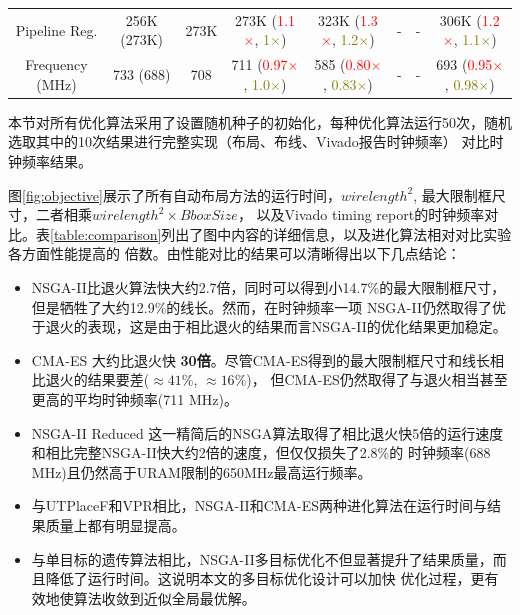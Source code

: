 \begin{table}[t]
\begin{adjustbox}{width=1.1\textwidth,center}
\begin{tabular}{c|c c| c c c c c}
  Pipeline Reg.		   & 256K  (273K) 		      & 273K	   		 &273K	   (\textcolor{red}{1.1$\times$}, \textcolor{olive}{1$\times$}) 	 	          & 323K	(\textcolor{red}{1.3$\times$}, \textcolor{olive}{1.2$\times$})   		  & -		                                                                      &   -                                                                            & 306K (\textcolor{red}{1.2$\times$}, \textcolor{olive}{1.1$\times$})   \\
  Frequency	(MHz)	 	 & 733  (688)   & 708 	 &711  (\textcolor{red}{0.97$\times$}, \textcolor{olive}{1.0$\times$})		        & 585 	(\textcolor{red}{0.80$\times$}, \textcolor{olive}{0.83$\times$})	& - 	      	                                                              & - 	                                                                           & 693 (\textcolor{red}{0.95$\times$}, \textcolor{olive}{0.98$\times$}) \\
	\bottomrule
	\end{tabular}
  \vspace{-0.2in}
\end{adjustbox}
\end{table}

本节对所有优化算法采用了设置随机种子的初始化，每种优化算法运行50次，随机选取其中的10次结果进行完整实现（布局、布线、Vivado报告时钟频率）
对比时钟频率结果。

图\ref{fig:objective}展示了所有自动布局方法的运行时间，$wirelength^2$, 最大限制框尺寸，二者相乘$wirelength^2 \times BboxSize$，
以及Vivado timing report的时钟频率对比。表\ref{table:comparison}列出了图中内容的详细信息，以及进化算法相对对比实验各方面性能提高的
倍数。由性能对比的结果可以清晰得出以下几点结论：

\begin{itemize}
    \item NSGA-II比退火算法快大约2.7倍，同时可以得到小14.7\%的最大限制框尺寸，但是牺牲了大约12.9\%的线长。然而，在时钟频率一项
    NSGA-II仍然取得了优于退火的表现，这是由于相比退火的结果而言NSGA-II的优化结果更加稳定。
    \item CMA-ES 大约比退火快 {\bf 30倍}。尽管CMA-ES得到的最大限制框尺寸和线长相比退火的结果要差($\approx41$\%, $\approx16$\%)，
    但CMA-ES仍然取得了与退火相当甚至更高的平均时钟频率(711 MHz)。
    \item NSGA-II Reduced 这一精简后的NSGA算法取得了相比退火快5倍的运行速度和相比完整NSGA-II快大约2倍的速度，但仅仅损失了2.8\%的
    时钟频率(688 MHz)且仍然高于URAM限制的650MHz最高运行频率。
    \item 与UTPlaceF和VPR相比，NSGA-II和CMA-ES两种进化算法在运行时间与结果质量上都有明显提高。
    \item 与单目标的遗传算法相比，NSGA-II多目标优化不但显著提升了结果质量，而且降低了运行时间。这说明本文的多目标优化设计可以加快
    优化过程，更有效地使算法收敛到近似全局最优解。
\end{itemize}

